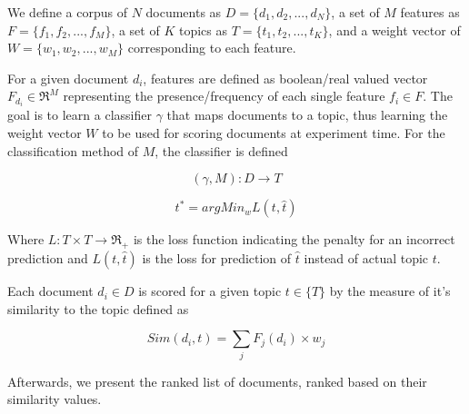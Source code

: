 

We define a corpus of $N$ documents as $D = \{{d_{1}}, {d_{2}}, ..., {d_{N}} \}$, a set of $M$ features as $F = \{{f_{1}}, {f_{2}}, ..., {f_{M}} \}$, a set of $K$ topics as $T = \{{t_{1}}, {t_{2}}, ..., {t_{K}} \}$, and a weight vector of $W = \{ {w_{1}}, {w_{2}}, ..., {w_{M}} \}$ corresponding to each feature. 

For a given document ${d_{i}}$, features are defined as boolean/real valued vector ${F_{d_{i}}} \in \Re^{M}$ representing the presence/frequency of each single feature ${f_{i}} \in F$. The goal is to learn a classifier $\gamma$ that maps documents to a topic, thus learning the weight vector $W$ to be used for scoring documents at experiment time. For the classification method of $M$, the classifier is defined

\begin{equation}
(\gamma, M) : D \to T 
\end{equation}

\begin{equation}
t^{*} = argMin_{w} L(t,\hat{t})
\end{equation}

Where ${L : T \times T \to \Re_{+} }$ is the loss function indicating the penalty for an incorrect prediction and ${L(t,\hat{t})}$ is the loss for prediction of ${\hat{t}}$ instead of actual topic $t$.

Each document ${d_{i}} \in D$ is scored for a given topic ${t \in \{ T \}}$ by the measure of it's similarity to the topic defined as

\begin{equation}
Sim({d_{i}}, t) = \sum_{j} F_{j}(d_{i}) \times {w_{j}}
\end{equation}

Afterwards, we present the ranked list of documents, ranked based on their similarity values.

